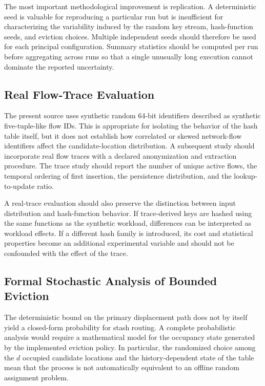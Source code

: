 \documentclass[conference]{IEEEtran}
\begin{document}
The most important methodological improvement is replication. A deterministic seed is valuable for reproducing a particular run but is insufficient for characterizing the variability induced by the random key stream, hash-function seeds, and eviction choices. Multiple independent seeds should therefore be used for each principal configuration. Summary statistics should be computed per run before aggregating across runs so that a single unusually long execution cannot dominate the reported uncertainty.

\subsection{Real Flow-Trace Evaluation}

The present source uses synthetic random 64-bit identifiers described as synthetic five-tuple-like flow IDs. This is appropriate for isolating the behavior of the hash table itself, but it does not establish how correlated or skewed network-flow identifiers affect the candidate-location distribution. A subsequent study should incorporate real flow traces with a declared anonymization and extraction procedure. The trace study should report the number of unique active flows, the temporal ordering of first insertion, the persistence distribution, and the lookup-to-update ratio.

A real-trace evaluation should also preserve the distinction between input distribution and hash-function behavior. If trace-derived keys are hashed using the same functions as the synthetic workload, differences can be interpreted as workload effects. If a different hash family is introduced, its cost and statistical properties become an additional experimental variable and should not be confounded with the effect of the trace.

\subsection{Formal Stochastic Analysis of Bounded Eviction}

The deterministic bound on the primary displacement path does not by itself yield a closed-form probability for stash routing. A complete probabilistic analysis would require a mathematical model for the occupancy state generated by the implemented eviction policy. In particular, the randomized choice among the $d$ occupied candidate locations and the history-dependent state of the table mean that the process is not automatically equivalent to an offline random assignment problem.
\end{document}
